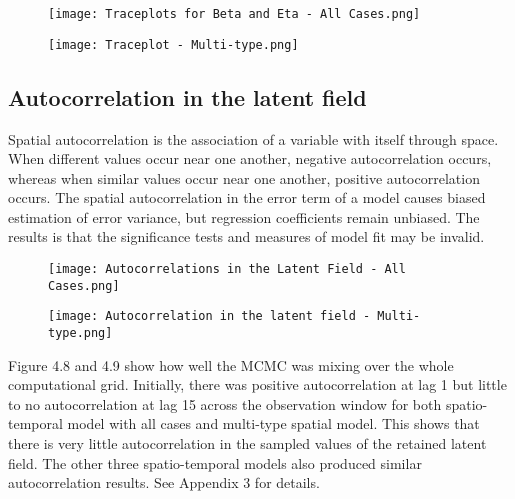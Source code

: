 \documentclass[a4paper]{thesis}
\begin{document}
\begin{figure}[H]
\begin{center}
\texttt{[image: Traceplots for Beta and Eta - All Cases.png]}
\end{center}
\end{figure}

\begin{figure}[H]
\begin{center}
\texttt{[image: Traceplot - Multi-type.png]}
\end{center}
\end{figure}

\subsection{Autocorrelation in the latent field}

Spatial autocorrelation is the association of a variable with itself through space. When different values occur near one another, negative autocorrelation occurs, whereas when similar values occur near one another, positive autocorrelation occurs. The spatial autocorrelation in the error term of a model causes biased estimation of error variance, but regression coefficients remain unbiased. The results is that the significance tests and measures of model fit may be invalid. 

\begin{figure}[H]
\begin{center}
\texttt{[image: Autocorrelations in the Latent Field - All Cases.png]}
\end{center}
\end{figure}

\begin{figure}[h]
\begin{center}
\texttt{[image: Autocorrelation in the latent field - Multi-type.png]}
\end{center}
\end{figure}

Figure 4.8 and 4.9 show how well the MCMC was mixing over the whole computational grid. Initially, there was positive autocorrelation at lag 1 but little to no autocorrelation at lag 15 across the observation window for both spatio-temporal model with all cases and multi-type spatial model. This shows that there is very little autocorrelation in the sampled values of the retained latent field. The other three spatio-temporal models also produced similar autocorrelation results. See Appendix 3 for details.
\end{document}
